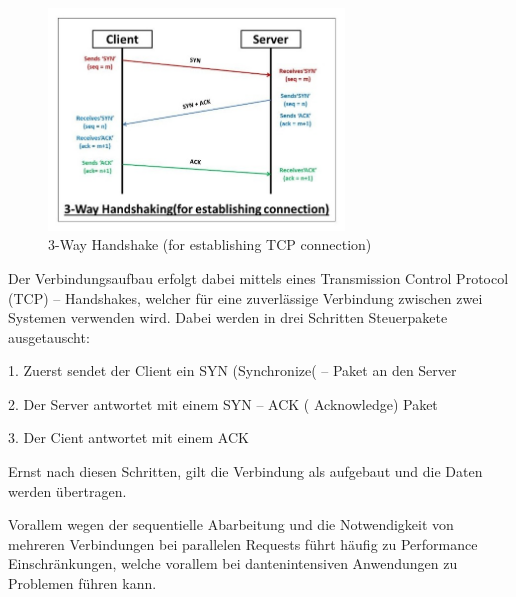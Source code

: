 \begin{figure}[htbp]
	\centering
	\includegraphics[width=0.7\textwidth]{images/http1_theory.jpg}
	\caption{3-Way Handshake (for establishing TCP connection)}
	\label{fig:threewayhandshake}
\end{figure}

Der Verbindungsaufbau erfolgt dabei mittels eines Transmission Control Protocol  (TCP) – Handshakes, welcher für eine zuverlässige Verbindung zwischen zwei Systemen verwenden wird. Dabei werden in drei Schritten Steuerpakete ausgetauscht:

1. Zuerst sendet der Client ein SYN (Synchronize( – Paket an den Server

2. Der Server antwortet mit einem SYN – ACK ( Acknowledge) Paket

3. Der Cient antwortet mit einem ACK

Ernst nach diesen Schritten, gilt die Verbindung als aufgebaut und die Daten werden übertragen.

Vorallem wegen der sequentielle Abarbeitung  und die Notwendigkeit von mehreren Verbindungen bei parallelen Requests führt häufig zu Performance Einschränkungen, welche vorallem bei dantenintensiven Anwendungen zu Problemen führen kann. 


